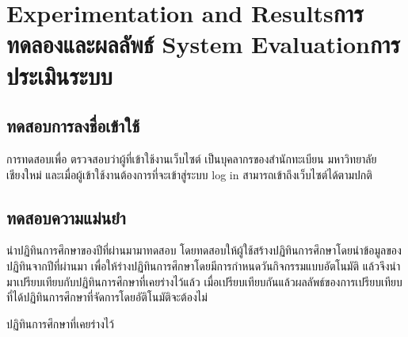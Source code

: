 \chapter{\ifproject%
\ifenglish Experimentation and Results\else การทดลองและผลลัพธ์\fi
\else%
\ifenglish System Evaluation\else การประเมินระบบ\fi
\fi}
\section{ทดสอบการลงชื่อเข้าใช้} 
   การทดสอบเพื่อ ตรวจสอบว่าผู้ที่เข้าใช้งานเว็บไซต์ เป็นบุคลากรของสำนักทะเบียน มหาวิทยาลัยเชียงใหม่ 
และเมื่อผู้เข้าใช้งานต้องการที่จะเข้าสู่ระบบ log in สามารถเข้าถึงเว็บไซต์ได้ตามปกติ

\section{ทดสอบความแม่นยำ}
   นำปฏิทินการศึกษาของปีที่ผ่านมามาทดสอบ โดยทดสอบให้ผู้ใช้สร้างปฏิทินการศึกษาโดยนำข้อมูลของปฏิทินจากปีที่ผ่านมา 
เพื่อให้ร่างปฏิทินการศึกษาโดยมีการกำหนดวันกิจกรรมแบบอัตโนมัติ แล้วจึงนำมาเปรียบเทียบกับปฏิทินการศึกษาที่เคยร่างไว้แล้ว 
เมื่อเปรียบเทียบกันแล้วผลลัพธ์ของการเปรียบเทียบที่ได้ปฏิทินการศึกษาที่จัดการโดยอัติโนมัติจะต้องไม่

ปฏิทินการศึกษาที่เคยร่างไว้


